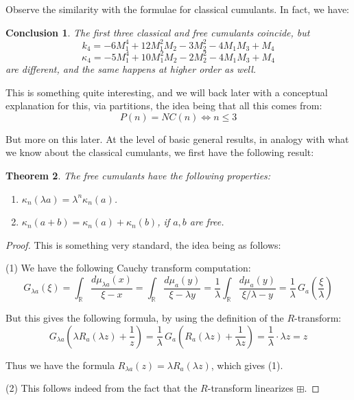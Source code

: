 \documentclass[12pt]{amsbook}
\newtheorem{theorem}{Theorem}[chapter]
\newtheorem{conclusion}[theorem]{Conclusion}
\begin{document}
Observe the similarity with the formulae for classical cumulants. In fact, we have:

\begin{conclusion}
The first three classical and free cumulants coincide, but
$$k_4=-6M_1^4+12M_1^2M_2-3M_2^2-4M_1M_3+M_4$$
$$\kappa_4=-5M_1^4+10M_1^2M_2-2M_2^2-4M_1M_3+M_4$$
are different, and the same happens at higher order as well.
\end{conclusion}

This is something quite interesting, and we will back later with a conceptual explanation for this, via partitions, the idea being that all this comes from:
$$P(n)=NC(n)\iff n\leq 3$$

But more on this later. At the level of basic general results, in analogy with what we know about the classical cumulants, we first have the following result:

\begin{theorem}
The free cumulants have the following properties:
\begin{enumerate}
\item $\kappa_n(\lambda a)=\lambda^n\kappa_n(a)$.

\item $\kappa_n(a+b)=\kappa_n(a)+\kappa_n(b)$, if $a,b$ are free.
\end{enumerate}
\end{theorem}

\begin{proof}
This is something very standard, the idea being as follows:

\medskip

(1) We have the following Cauchy transform computation:
$$G_{\lambda a}(\xi)
=\int_\mathbb R\frac{d\mu_{\lambda a}(x)}{\xi-x}
=\int_\mathbb R\frac{d\mu_a(y)}{\xi-\lambda y}
=\frac{1}{\lambda}\int_\mathbb R\frac{d\mu_a(y)}{\xi/\lambda-y}
=\frac{1}{\lambda}\,G_a\left(\frac{\xi}{\lambda}\right)$$

But this gives the following formula, by using the definition of the $R$-transform:
$$G_{\lambda a}\left(\lambda R_a(\lambda z)+\frac{1}{z}\right)
=\frac{1}{\lambda}\,G_a\left(R_a(\lambda z)+\frac{1}{\lambda z}\right)
=\frac{1}{\lambda}\cdot\lambda z
=z$$

Thus we have the formula $R_{\lambda a}(z)=\lambda R_a(\lambda z)$, which gives (1). 

\medskip

(2) This follows indeed from the fact that the $R$-transform linearizes $\boxplus$.
\end{proof}
\end{document}

